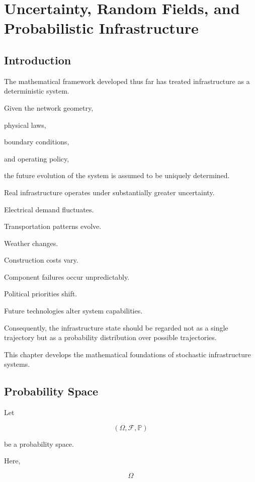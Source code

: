 \documentclass[11pt,fleqn]{book}
\numberwithin{equation}{chapter}
\theoremstyle{plain}
\theoremstyle{definition}
\theoremstyle{remark}
\begin{document}
\chapter{Uncertainty, Random Fields, and Probabilistic Infrastructure}

\section{Introduction}

The mathematical framework developed thus far has treated infrastructure
as a deterministic system.

Given the network geometry,

physical laws,

boundary conditions,

and operating policy,

the future evolution of the system is assumed to be uniquely determined.

Real infrastructure operates under substantially greater uncertainty.

Electrical demand fluctuates.

Transportation patterns evolve.

Weather changes.

Construction costs vary.

Component failures occur unpredictably.

Political priorities shift.

Future technologies alter system capabilities.

Consequently, the infrastructure state should be regarded not as a
single trajectory but as a probability distribution over possible
trajectories.

This chapter develops the mathematical foundations of stochastic
infrastructure systems.


\section{Probability Space}

Let

\[
(\Omega,\mathcal F,\mathbb P)
\]

be a probability space.

Here,

\[
\Omega
\]
\end{document}
